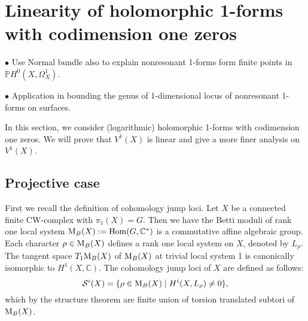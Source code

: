 \documentclass[a4paper,12pt,reqno]{amsart}
\theoremstyle{plain}
\theoremstyle{remark}
\newcommand{\C}{\mathbb C}
\newcommand{\Hom}{\operatorname{Hom}}
\begin{document}
\section{Linearity of holomorphic 1-forms with codimension one zeros}

{\color{red} $\bullet$ Use Normal bundle also to explain nonresonant 1-forms form finite points in $\mathbb{P}H^0(X, \Omega_X^1)$.

$\bullet$ Application in bounding the genus of 1-dimensional locus of nonresonant  1-forms on surfaces.}

In this section, we consider (logarithmic) holomorphic 1-forms with codimension one zeros. We will prove that $V^1(X)$ is linear and give a more finer analysis on $V^1(X)$. 

\subsection{Projective case}


First we recall the definition of cohomology jump loci. Let $X$ be a connected finite CW-complex with $\pi_{1}(X)=G$. Then we have the Betti moduli of rank one local system $\textnormal{M}_B(X):= \Hom(G,\C^{\ast})$ is a commutative affine algebraic group. Each character $\rho \in \textnormal{M}_B(X)$ defines a rank one local system on $X$, denoted by $L_{\rho}$. The tangent space $T_1\textnormal{M}_B(X)$ of $\textnormal{M}_B(X)$ at trivial local system 1 is canonically isomorphic to $H^1(X, \C)$.
The cohomology jump loci of $X$ are defined as follows:
$$\mathcal{S}^i(X)=\lbrace \rho\in \textnormal{M}_B(X) \mid  H^{i}(X, L_{\rho})\neq 0 \rbrace,$$ 
which by the structure theorem are finite union of torsion translated subtori of $\textnormal{M}_B(X)$.
\end{document}
